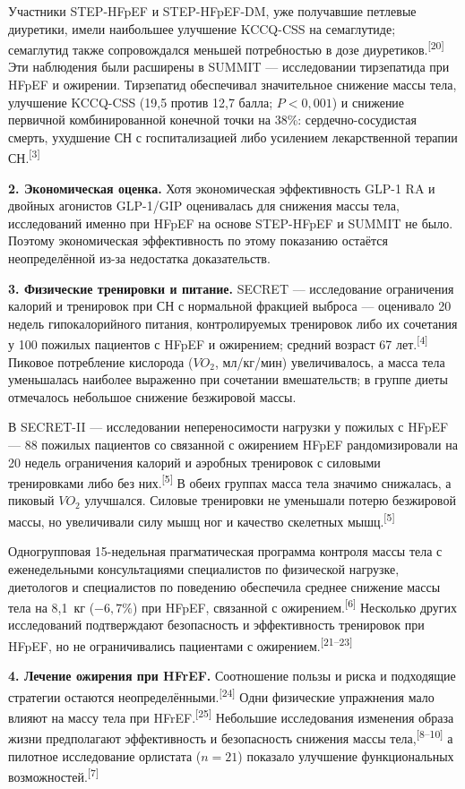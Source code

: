 \documentclass[11pt,a4paper]{article}
\newcommand{\src}[1]{\textsuperscript{[#1]}}
\begin{document}
Участники STEP-HFpEF и STEP-HFpEF-DM, уже получавшие петлевые диуретики, имели наибольшее улучшение KCCQ-CSS на семаглутиде; семаглутид также сопровождался меньшей потребностью в дозе диуретиков.\src{20} Эти наблюдения были расширены в SUMMIT --- исследовании тирзепатида при HFpEF и ожирении. Тирзепатид обеспечивал значительное снижение массы тела, улучшение KCCQ-CSS (19,5 против 12,7 балла; $P<0{,}001$) и снижение первичной комбинированной конечной точки на 38\%: сердечно-сосудистая смерть, ухудшение СН с госпитализацией либо усилением лекарственной терапии СН.\src{3}

\textbf{2. Экономическая оценка.} Хотя экономическая эффективность GLP-1 RA и двойных агонистов GLP-1/GIP оценивалась для снижения массы тела, исследований именно при HFpEF на основе STEP-HFpEF и SUMMIT не было. Поэтому экономическая эффективность по этому показанию остаётся неопределённой из-за недостатка доказательств.

\textbf{3. Физические тренировки и питание.} SECRET --- исследование ограничения калорий и тренировок при СН с нормальной фракцией выброса --- оценивало 20 недель гипокалорийного питания, контролируемых тренировок либо их сочетания у 100 пожилых пациентов с HFpEF и ожирением; средний возраст 67 лет.\src{4} Пиковое потребление кислорода ($VO_2$, мл/кг/мин) увеличивалось, а масса тела уменьшалась наиболее выраженно при сочетании вмешательств; в группе диеты отмечалось небольшое снижение безжировой массы.

В SECRET-II --- исследовании непереносимости нагрузки у пожилых с HFpEF --- 88 пожилых пациентов со связанной с ожирением HFpEF рандомизировали на 20 недель ограничения калорий и аэробных тренировок с силовыми тренировками либо без них.\src{5} В обеих группах масса тела значимо снижалась, а пиковый $VO_2$ улучшался. Силовые тренировки не уменьшали потерю безжировой массы, но увеличивали силу мышц ног и качество скелетных мышц.\src{5}

Одногрупповая 15-недельная прагматическая программа контроля массы тела с еженедельными консультациями специалистов по физической нагрузке, диетологов и специалистов по поведению обеспечила среднее снижение массы тела на 8,1~кг ($-6{,}7\%$) при HFpEF, связанной с ожирением.\src{6} Несколько других исследований подтверждают безопасность и эффективность тренировок при HFpEF, но не ограничивались пациентами с ожирением.\src{21--23}

\textbf{4. Лечение ожирения при HFrEF.} Соотношение пользы и риска и подходящие стратегии остаются неопределёнными.\src{24} Одни физические упражнения мало влияют на массу тела при HFrEF.\src{25} Небольшие исследования изменения образа жизни предполагают эффективность и безопасность снижения массы тела,\src{8--10} а пилотное исследование орлистата ($n=21$) показало улучшение функциональных возможностей.\src{7}
\end{document}
